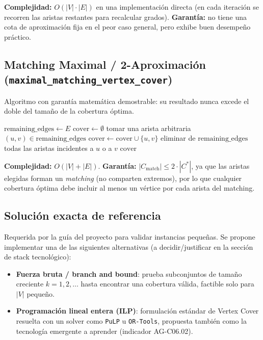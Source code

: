 \documentclass[11pt,a4paper]{article}
\begin{document}
\noindent \textbf{Complejidad:} $O(|V| \cdot |E|)$ en una implementación directa
(en cada iteración se recorren las aristas restantes para recalcular grados).
\textbf{Garantía:} no tiene una cota de aproximación fija en el peor caso general,
pero exhibe buen desempeño práctico.

\subsection{Matching Maximal / 2-Aproximación (\texttt{maximal\_matching\_vertex\_cover})}
Algoritmo con garantía matemática demostrable: su resultado nunca excede el doble del
tamaño de la cobertura óptima.

\begin{algorithm}[H]
\caption{Matching Maximal (2-aproximación)}
\begin{algorithmic}[1]
\State $\text{remaining\_edges} \gets E$
\State $\text{cover} \gets \emptyset$
	\State tomar una arista arbitraria $(u,v) \in \text{remaining\_edges}$
	\State $\text{cover} \gets \text{cover} \cup \{u, v\}$
	\State eliminar de $\text{remaining\_edges}$ todas las aristas incidentes a $u$ o a $v$
\EndWhile
\State \Return $\text{cover}$
\end{algorithmic}
\end{algorithm}

\noindent \textbf{Complejidad:} $O(|V| + |E|)$. \textbf{Garantía:} $|C_{\text{match}}|
\leq 2 \cdot |C^{*}|$, ya que las aristas elegidas forman un \emph{matching} (no comparten
extremos), por lo que cualquier cobertura óptima debe incluir al menos un vértice por cada
arista del matching.

\subsection{Solución exacta de referencia}
Requerida por la guía del proyecto para validar instancias pequeñas. Se propone implementar
una de las siguientes alternativas (a decidir/justificar en la sección de stack tecnológico):
\begin{itemize}
	\item \textbf{Fuerza bruta / branch and bound}: prueba subconjuntos de tamaño creciente
	$k = 1, 2, \dots$ hasta encontrar una cobertura válida, factible solo para $|V|$ pequeño.
	\item \textbf{Programación lineal entera (ILP)}: formulación estándar de Vertex Cover
	resuelta con un solver como \texttt{PuLP} u \texttt{OR-Tools}, propuesta también como la
	tecnología emergente a aprender (indicador AG-C06.02).
\end{itemize}
\end{document}
